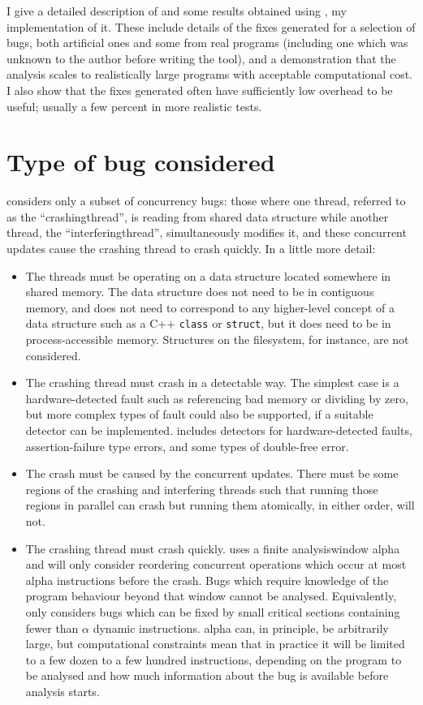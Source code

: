 I give a detailed description of {\technique} and some results
obtained using \implementation, my implementation of it.  These
include details of the fixes generated for a selection of bugs, both
artificial ones and some from real programs (including one which was
unknown to the author before writing the tool), and a demonstration
that the analysis scales to realistically large programs with
acceptable computational cost.  I also show that the fixes generated
often have sufficiently low overhead to be useful; usually a few
percent in more realistic tests.

\section{Type of bug considered}

{\Technique} considers only a subset of concurrency bugs: those where
one thread, referred to as the ``\gls{crashingthread}'', is reading
from shared data structure while another thread, the
``\gls{interferingthread}'', simultaneously modifies it, and these
concurrent updates cause the crashing thread to crash quickly.  In a
little more detail:

\begin{itemize}
\item The threads must be operating on a data structure located
  somewhere in shared memory.  The data structure does not need to be
  in contiguous memory, and does not need to correspond to any
  higher-level concept of a data structure such as a C++
  \texttt{class} or \texttt{struct}, but it does need to be in
  process-accessible memory.  Structures on the filesystem, for
  instance, are not considered.
\item The crashing thread must crash in a detectable way.  The
  simplest case is a hardware-detected fault such as referencing bad
  memory or dividing by zero, but more complex types of fault could
  also be supported, if a suitable detector can be implemented.
  {\Implementation} includes detectors for hardware-detected faults,
  assertion-failure type errors, and some types of double-free error.
\item The crash must be caused by the concurrent updates.  There must
  be some regions of the crashing and interfering threads such that
  running those regions in parallel can crash but running them
  atomically, in either order, will not.
\item The crashing thread must crash quickly.  {\Technique} uses a
  finite \gls{analysiswindow} \gls{alpha} and will only consider
  reordering concurrent operations which occur at most \gls{alpha}
  instructions before the crash.  Bugs which require knowledge of the
  program behaviour beyond that window cannot be analysed.
  Equivalently, {\technique} only considers bugs which can be fixed by
  small critical sections containing fewer than $\alpha$ dynamic
  instructions.  \gls{alpha} can, in principle, be arbitrarily large,
  but computational constraints mean that in practice it will be
  limited to a few dozen to a few hundred instructions, depending on
  the program to be analysed and how much information about the bug is
  available before analysis starts.
\end{itemize}

